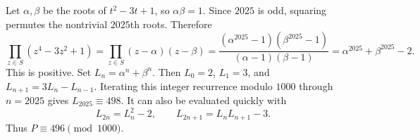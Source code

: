 Let $\alpha,\beta$ be the roots of $t^2-3t+1$, so $\alpha\beta=1$. Since $2025$ is odd, squaring permutes the nontrivial $2025$th roots. Therefore
\[
\prod_{z\in S}(z^4-3z^2+1)
=\prod_{z\in S}(z-\alpha)(z-\beta)
=\dfrac{(\alpha^{2025}-1)(\beta^{2025}-1)}{(\alpha-1)(\beta-1)}
=\alpha^{2025}+\beta^{2025}-2.
\]
This is positive. Set $L_n=\alpha^n+\beta^n$. Then $L_0=2$, $L_1=3$, and $L_{n+1}=3L_n-L_{n-1}$. Iterating this integer recurrence modulo $1000$ through $n=2025$ gives $L_{2025}\equiv498$. It can also be evaluated quickly with
\[
L_{2n}=L_n^2-2,\qquad L_{2n+1}=L_nL_{n+1}-3.
\]
Thus $\boxed{P\equiv496\pmod{1000}}$.
